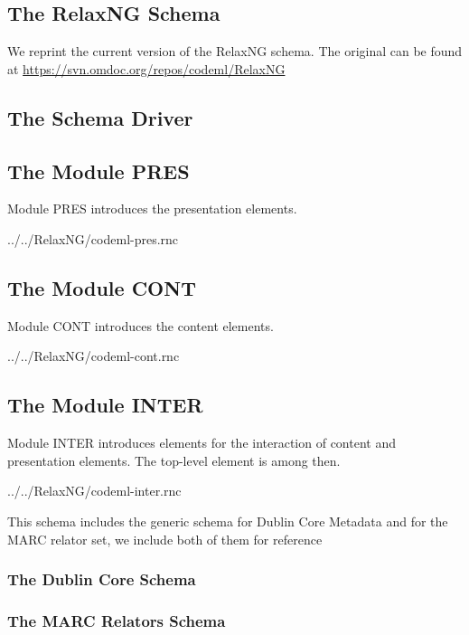 \begin{appendix}
\chapter{The {\codeml} RelaxNG Schema}\label{sec:rnc}
We reprint the current version of the {\codeml} RelaxNG schema. The original can be found
at {\url{https://svn.omdoc.org/repos/codeml/RelaxNG}}

\section{The {\codeml} Schema Driver}


\section{The {\codeml} Module PRES}
Module PRES introduces the presentation {\codeml} elements. 


                {../../RelaxNG/codeml-pres.rnc}

\section{The {\codeml} Module CONT}
Module CONT introduces the content {\codeml} elements. 


                {../../RelaxNG/codeml-cont.rnc}

\section{The {\codeml} Module INTER}
Module INTER introduces elements for the interaction of content and presentation
{\codeml} elements. The top-level {} element is among then. 


{../../RelaxNG/codeml-inter.rnc}

This schema includes the generic schema for Dublin Core Metadata and for the MARC relator 
set, we include both of them for reference
\subsection{The Dublin Core Schema}

\subsection{The MARC Relators Schema}

\end{appendix}
              
